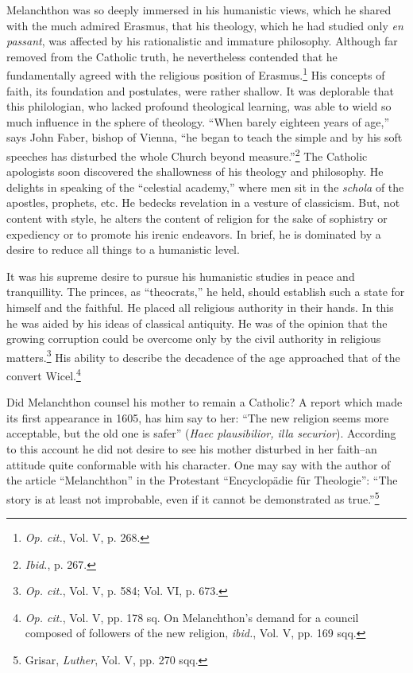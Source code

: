 Melanchthon was so deeply immersed in his humanistic views,
which he shared with the much admired Erasmus, that his theology,
which he had studied only \textit{en passant}, was affected by his rationalistic
and immature philosophy. Although far removed from the Catholic
truth, he nevertheless contended that he fundamentally agreed with
the religious position of Erasmus.\footnote{\textit{Op. cit.}, Vol. V, p. 268.}
 His concepts of faith, its foundation
and postulates, were rather shallow. It was deplorable that
this philologian, who lacked profound theological learning, was able
to wield so much influence in the sphere of theology. “When barely
eighteen years of age,” says John Faber, bishop of Vienna, “he began
to teach the simple and by his soft speeches has disturbed the whole
Church beyond measure.”\footnote{\textit{Ibid.}, p. 267.}
The Catholic apologists soon discovered
the shallowness of his theology and philosophy. He delights in speaking
of the “celestial academy,” where men sit in the \textit{schola} of the
apostles, prophets, etc. He bedecks revelation in a vesture of classicism.
But, not content with style, he alters the content of religion
for the sake of sophistry or expediency or to promote his irenic endeavors.
In brief, he is dominated by a desire to reduce all things to
a humanistic level.

It was his supreme desire to pursue his humanistic studies in peace
and tranquillity. The princes, as “theocrats,” he held, should establish
such a state for himself and the faithful. He placed all religious
authority in their hands. In this he was aided by his ideas of classical
antiquity. He was of the opinion that the growing corruption
could be overcome only by the civil authority in religious matters.\footnote{\textit{Op. cit.}, Vol. V, p. 584; Vol. VI, p. 673.}
His ability to describe the decadence of the age approached that of
the convert Wicel.\footnote
{\textit{Op. cit.}, Vol. V, pp. 178 sq. On Melanchthon’s demand for a council composed of
followers of the new religion, \textit{ibid.}, Vol. V, pp. 169 sqq.}

Did Melanchthon counsel his mother to remain a Catholic? A
report which made its first appearance in 1605, has him say to her:
“The new religion seems more acceptable, but the old one is safer”
(\textit{Haec plausibilior, illa securior}). According to this account he did
not desire to see his mother disturbed in her faith--an attitude quite
conformable with his character. One may say with the author of the
article “Melanchthon” in the Protestant “Encyclopädie für Theologie”:
“The story is at least not improbable, even if it cannot be
demonstrated as true.”\footnote{Grisar, \textit{Luther}, Vol. V, pp. 270 sqq.}


